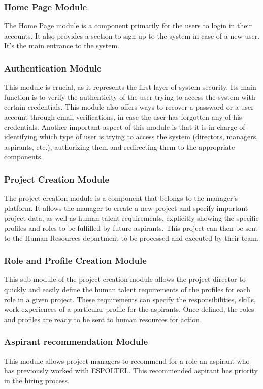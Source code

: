 \documentclass{scrreprt}
\begin{document}
\subsubsection{Home Page Module}
The Home Page module is a component primarily for the users to login in their accounts. It also provides a section to sign up to the system in case of a new user. It's the main entrance to the system.
\subsubsection{Authentication Module}
This module is crucial, as it represents the first layer of system security. Its main function is to verify the authenticity of the user trying to access the system with certain credentials. This module also offers ways to recover a password or a user account through email verifications, in case the user has forgotten any of his credentials. Another important aspect of this module is that it is in charge of identifying which type of user is trying to access the system (directors, managers, aspirants, etc.), authorizing them and redirecting them to the appropriate components.
\subsubsection{Project Creation Module}
The project creation module is a component that belongs to the manager's platform. It allows the manager to create a new project and specify important project data, as well as human talent requirements, explicitly showing the specific profiles and roles to be fulfilled by future aspirants. This project can then be sent to the Human Resources department to be processed and executed by their team.
\subsubsection{Role and Profile Creation Module}
This sub-module of the project creation module allows the project director to quickly and easily define the human talent requirements of the profiles for each role in a given project. These requirements can specify the responsibilities, skills, work experiences of a particular profile for the aspirants. Once defined, the roles and profiles are ready to be sent to human resources for action.
\subsubsection{Aspirant recommendation Module}
This module allows project managers to recommend for a role an aspirant who has previously worked with ESPOLTEL. This recommended aspirant has priority in the hiring process.
\end{document}

